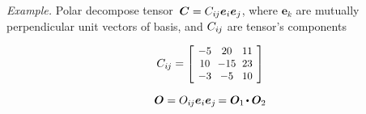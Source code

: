\begin{tcolorbox}
\small\setlength{\abovedisplayskip}{2pt}\setlength{\belowdisplayskip}{2pt}

\emph{Example.} Polar decompose tensor~${\bm{C} = C_{i\hspace{-0.1ex}j} \bm{e}_i \bm{e}_j}$, where $\bm{e}_k$ are mutually perpendicular unit vectors of basis, and $C_{i\hspace{-0.1ex}j}$ are tensor’s components

\begin{equation*}
C_{i\hspace{-0.1ex}j} =
\scalebox{0.92}[0.92]{$\left[\hspace{-0.2ex}\begin{array}{c@{\hspace{.6em}}c@{\hspace{.6em}}c}
-5 & 20 & 11 \\
10 & -15 & 23 \\
-3 & -5 & 10
\end{array}\hspace{-0.2ex}\right]$}
\end{equation*}

\begin{equation*}
\rotationtensor = O_{i\hspace{-0.1ex}j} \bm{e}_i \bm{e}_j \hspace{-0.2ex}
= \bm{O}_1 \hspace{-0.2ex} \dotp \bm{O}_2
\end{equation*}


\end{tcolorbox}
